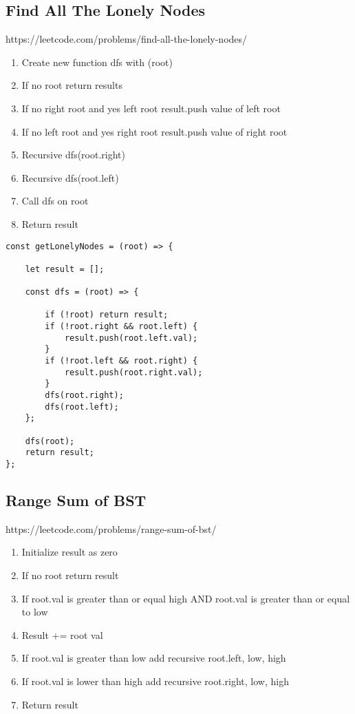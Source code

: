 \documentclass[10pt]{article}
\begin{document}
\pagebreak
\medskip   
\subsection{Find All The Lonely Nodes}
https://leetcode.com/problems/find-all-the-lonely-nodes/

\begin{enumerate}
	\item Create new function dfs with (root)
	\item If no root return results 
	\item If no right root and yes left root result.push value of left root
	\item If no left root and yes right root result.push value of right root
	\item Recursive dfs(root.right)
	\item Recursive dfs(root.left)
	\item Call dfs on root
	\item Return result
\end{enumerate}

\begin{lstlisting}[title=Solution getLonelyNodes, captionpos=t]
const getLonelyNodes = (root) => {
    
    let result = [];
    
    const dfs = (root) => {
        
        if (!root) return result; 
        if (!root.right && root.left) {
            result.push(root.left.val);
        }
        if (!root.left && root.right) {
            result.push(root.right.val);
        }
        dfs(root.right);
        dfs(root.left);
    };
    
    dfs(root);
    return result;
};
\end{lstlisting}

\medskip %










\pagebreak
\medskip   
\subsection{Range Sum of BST}
https://leetcode.com/problems/range-sum-of-bst/

\begin{enumerate}
	\item Initialize result as zero
	\item If no root return result 
	\item If root.val is greater than or equal high AND root.val is greater than or equal to low 
	\item Result += root val
	\item If root.val is greater than low add recursive root.left, low, high
	\item If root.val is lower than high add recursive root.right, low, high
	\item Return result
\end{enumerate}
\end{document}
